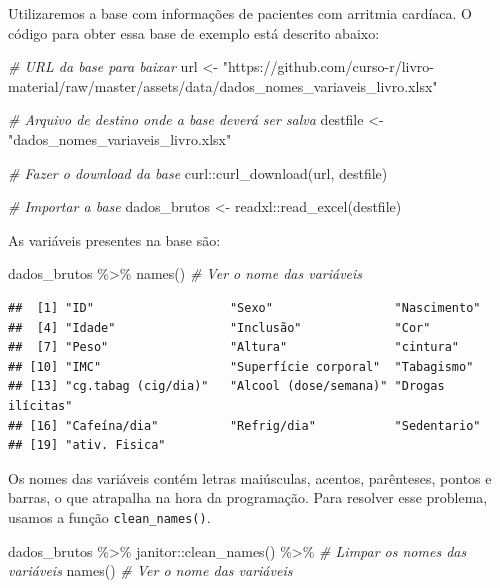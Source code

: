 \documentclass[
]{book}
\newenvironment{Shaded}{\begin{snugshade}}{\end{snugshade}}
\newcommand{\CommentTok}[1]{\textcolor[rgb]{0.56,0.35,0.01}{\textit{#1}}}
\newcommand{\FunctionTok}[1]{\textcolor[rgb]{0.00,0.00,0.00}{#1}}
\newcommand{\NormalTok}[1]{#1}
\newcommand{\OtherTok}[1]{\textcolor[rgb]{0.56,0.35,0.01}{#1}}
\newcommand{\SpecialCharTok}[1]{\textcolor[rgb]{0.00,0.00,0.00}{#1}}
\newcommand{\StringTok}[1]{\textcolor[rgb]{0.31,0.60,0.02}{#1}}
\begin{document}
Utilizaremos a base com informações de pacientes com arritmia cardíaca. O código para obter essa base de exemplo está descrito abaixo:

\begin{Shaded}
\begin{Highlighting}[]
\CommentTok{\# URL da base para baixar}
\NormalTok{url }\OtherTok{\textless{}{-}} \StringTok{"https://github.com/curso{-}r/livro{-}material/raw/master/assets/data/dados\_nomes\_variaveis\_livro.xlsx"}

\CommentTok{\# Arquivo de destino onde a base deverá ser salva}
\NormalTok{destfile }\OtherTok{\textless{}{-}} \StringTok{"dados\_nomes\_variaveis\_livro.xlsx"}

\CommentTok{\# Fazer o download da base}
\NormalTok{curl}\SpecialCharTok{::}\FunctionTok{curl\_download}\NormalTok{(url, destfile)}

\CommentTok{\# Importar a base }
\NormalTok{dados\_brutos }\OtherTok{\textless{}{-}}\NormalTok{ readxl}\SpecialCharTok{::}\FunctionTok{read\_excel}\NormalTok{(destfile)}
\end{Highlighting}
\end{Shaded}

As variáveis presentes na base são:

\begin{Shaded}
\begin{Highlighting}[]
\NormalTok{dados\_brutos }\SpecialCharTok{\%\textgreater{}\%} \FunctionTok{names}\NormalTok{() }\CommentTok{\# Ver o nome das variáveis}
\end{Highlighting}
\end{Shaded}

\begin{verbatim}
##  [1] "ID"                   "Sexo"                 "Nascimento"          
##  [4] "Idade"                "Inclusão"             "Cor"                 
##  [7] "Peso"                 "Altura"               "cintura"             
## [10] "IMC"                  "Superfície corporal"  "Tabagismo"           
## [13] "cg.tabag (cig/dia)"   "Alcool (dose/semana)" "Drogas ilícitas"     
## [16] "Cafeína/dia"          "Refrig/dia"           "Sedentario"          
## [19] "ativ. Fisica"
\end{verbatim}

Os nomes das variáveis contém letras maiúsculas, acentos, parênteses, pontos e barras, o que atrapalha na hora da programação. Para resolver esse problema, usamos a função \texttt{clean\_names()}.

\begin{Shaded}
\begin{Highlighting}[]
\NormalTok{dados\_brutos }\SpecialCharTok{\%\textgreater{}\%} 
\NormalTok{  janitor}\SpecialCharTok{::}\FunctionTok{clean\_names}\NormalTok{() }\SpecialCharTok{\%\textgreater{}\%} \CommentTok{\# Limpar os nomes das variáveis}
  \FunctionTok{names}\NormalTok{() }\CommentTok{\# Ver o nome das variáveis}
\end{Highlighting}
\end{Shaded}
\end{document}
